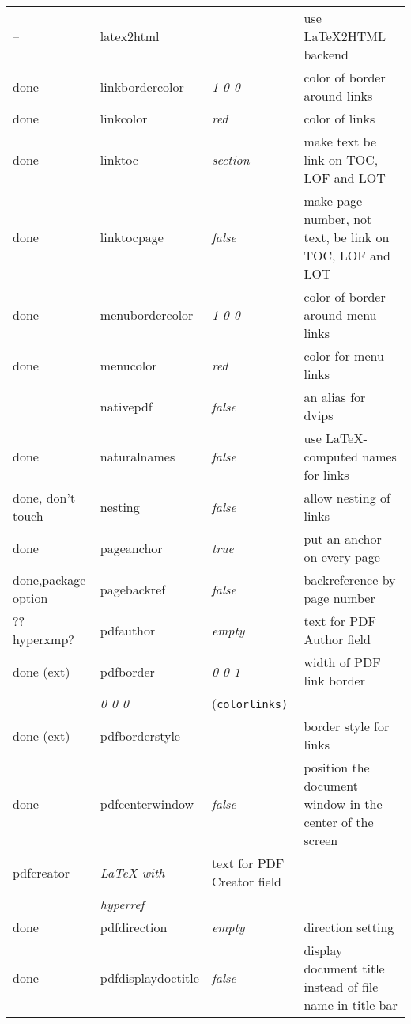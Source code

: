 \begin{longtable}{@{}l>{\ttfamily}llp{7cm}@{}}
-- & latex2html         &                        & use \textsf{\LaTeX2HTML} backend \\
done & linkbordercolor    & \textit{1 0 0}         & color of border around links \\
done & linkcolor          & \textit{red}           & color of links \\
done &linktoc            & \textit{section}       & make text be link on TOC, LOF and LOT \\
done & linktocpage        & \textit{false}         & make page number, not text, be link on TOC, LOF and LOT \\
done & menubordercolor    & \textit{1 0 0}         & color of border around menu links \\
done & menucolor          & \textit{red}           & color for menu links \\
-- & nativepdf          & \textit{false}         & an alias for \textsf{dvips} \\
done & naturalnames       & \textit{false}         & use \LaTeX-computed names for links \\
done, don't touch & nesting            & \textit{false}         & allow nesting of links \\
done & pageanchor         & \textit{true}          & put an anchor on every page \\
done,package option & pagebackref        & \textit{false}         & backreference by page number \\
?? hyperxmp? & pdfauthor          & \textit{empty}         & text for PDF Author field \\
done (ext) & pdfborder          & \textit{0 0 1}         & width of PDF link border \\
                   & \textit{0 0 0}         & (\texttt{colorlinks)} \\
done (ext) & pdfborderstyle     &                        & border style for links \\
done & pdfcenterwindow    & \textit{false}         & position the document window in the center of the screen \\
pdfcreator         & \textit{LaTeX with}    & text for PDF Creator field \\
                   & \textit{hyperref}      & \\
done &pdfdirection       & \textit{empty}         & direction setting \\
done &pdfdisplaydoctitle & \textit{false}         & display document title instead
                                              of file name in title bar\\

\end{longtable}
